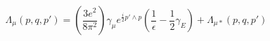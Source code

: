\begin{equation}
\Lambda_{\mu}(p,q,p')=\left(\frac{3e^{2}}{8\pi^{2}}\right)\gamma_{\mu}e^{\frac{i}{2}p'\wedge
p}\left(\frac{1}{\epsilon}-\frac{1}{2}\gamma_{E}\right)+\Lambda_{\mu\ast}(p,q,p')
\end{equation}

